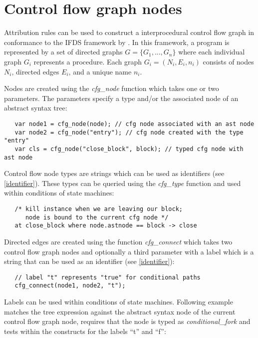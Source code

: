 \section{Control flow graph nodes}\label{cfg}

Attribution rules can be used to construct a interprocedural control
flow graph in conformance to the IFDS framework by
\cite{Reps:1995}. In this framework, a program is represented by a
set of directed graphs $G = \{G_1, ..., G_n\}$ where each individual
graph $G_i$ represents a procedure. Each graph $G_i = (N_i, E_i, n_i)$
consists of nodes $N_i$, directed edges $E_i$, and a unique name $n_i$.

Nodes are created using the \textit{cfg\_node} function
which takes one or two parameters. The parameters specify a type and/or
the associated node of an abstract syntax tree:

\begin{lstlisting}
   var node1 = cfg_node(node); // cfg node associated with an ast node
   var node2 = cfg_node("entry"); // cfg node created with the type "entry"
   var cls = cfg_node("close_block", block); // typed cfg node with ast node
\end{lstlisting}

Control flow node types are strings which
can be used as identifiers (see \ref{identifier}). These types can be
queried using the \textit{cfg\_type} function and used
within conditions of state machines:

\begin{lstlisting}
   /* kill instance when we are leaving our block;
      node is bound to the current cfg node */
   at close_block where node.astnode == block -> close
\end{lstlisting}

Directed edges are created using the function
\textit{cfg\_connect} which takes two control flow
graph nodes and optionally a third parameter with a label which is a
string that can be used as an identifier (see \ref{identifier}):

\begin{lstlisting}
   // label "t" represents "true" for conditional paths
   cfg_connect(node1, node2, "t");
\end{lstlisting}

Labels can be used within conditions of state machines.
Following example matches the tree expression against
the abstract syntax node of the current control flow
graph node, requires that the node is typed as
\textit{conditional\_fork} and tests within the
 constructs for the labels ``t'' and ``f'':

